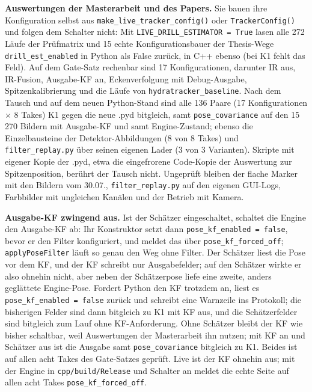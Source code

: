 \documentclass[11pt,a4paper,fleqn]{article}
\newcommand{\code}[1]{\texttt{#1}}
\begin{document}
\textbf{Auswertungen der Masterarbeit und des Papers.} Sie bauen ihre Konfiguration selbst aus
\code{make\_live\_tracker\_config()} oder \code{TrackerConfig()} und folgen dem Schalter nicht: Mit
\code{LIVE\_DRILL\_ESTIMATOR = True} lasen alle 272 Läufe der Prüfmatrix und 15 echte Konfigurationsbauer der
Thesis-Wege \code{drill\_est\_enabled} in Python als False zurück, in C++ ebenso (bei K1 fehlt das Feld). Auf dem
Gate-Satz rechenbar sind 17 Konfigurationen, darunter IR aus, IR-Fusion, Ausgabe-KF an, Eckenverfolgung mit
Debug-Ausgabe, Spitzenkalibrierung und die Läufe von \code{hydratracker\_baseline}. Nach dem Tausch und auf dem neuen
Python-Stand sind alle 136 Paare (17 Konfigurationen $\times$ 8 Takes) K1 gegen die neue .pyd bitgleich, samt
\code{pose\_covariance} auf den 15\,270 Bildern mit Ausgabe-KF und samt Engine-Zustand; ebenso die Einzelbausteine
der Detektor-Abbildungen (8 von 8 Takes) und \code{filter\_replay.py} über seinen eigenen Lader (3 von 3 Varianten).
Skripte mit eigener Kopie der .pyd, etwa die eingefrorene Code-Kopie der Auswertung zur Spitzenposition, berührt der
Tausch nicht. Ungeprüft bleiben der flache Marker mit den Bildern vom 30.07., \code{filter\_replay.py} auf den eigenen
GUI-Logs, Farbbilder mit ungleichen Kanälen und der Betrieb mit Kamera.

\textbf{Ausgabe-KF zwingend aus.} Ist der Schätzer eingeschaltet, schaltet die Engine den Ausgabe-KF ab: Ihr
Konstruktor setzt dann \code{pose\_kf\_enabled = false}, bevor er den Filter konfiguriert, und meldet das über
\code{pose\_kf\_forced\_off}; \code{applyPoseFilter} läuft so genau den Weg ohne Filter. Der Schätzer liest die
Pose vor dem KF, und der KF schreibt nur Ausgabefelder; auf den Schätzer wirkte er also ohnehin nicht, aber neben
der Schätzerpose liefe eine zweite, anders geglättete Engine-Pose. Fordert Python den KF trotzdem an, liest es
\code{pose\_kf\_enabled = false} zurück und schreibt eine Warnzeile ins Protokoll; die bisherigen Felder sind dann
bitgleich zu K1 mit KF aus, und die Schätzerfelder sind bitgleich zum Lauf ohne KF-Anforderung. Ohne Schätzer bleibt
der KF wie bisher schaltbar, weil Auswertungen der Masterarbeit ihn nutzen; mit KF an und Schätzer aus ist die
Ausgabe samt \code{pose\_covariance} bitgleich zu K1. Beides ist auf allen acht Takes des Gate-Satzes geprüft. Live
ist der KF ohnehin aus; mit der Engine in \code{cpp/build/Release} und Schalter an meldet die echte Seite auf allen
acht Takes \code{pose\_kf\_forced\_off}.
\end{document}
